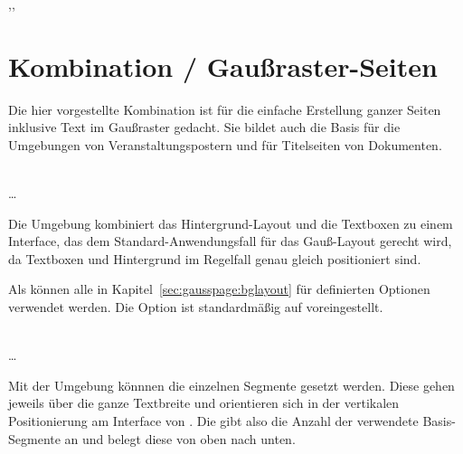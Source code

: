 \begin{Declaration}
  \\
  \\
  \\
  \\
  \\
  ,,\\
\end{Declaration}


\section{Kombination / Gaußraster-Seiten}\label{sec:gausspage:kombi}

Die hier vorgestellte Kombination ist für die einfache Erstellung ganzer Seiten
inklusive Text im Gaußraster gedacht.
Sie bildet auch die Basis für die Umgebungen von Veranstaltungspostern und
für Titelseiten von Dokumenten.

\begin{Declaration}
    \\
  \quad\dots\\
\end{Declaration}

Die Umgebung  kombiniert das Hintergrund-Layout
und die Textboxen zu einem Interface, das dem Standard-Anwendungsfall für
das Gauß-Layout gerecht wird, da Textboxen und Hintergrund im Regelfall
genau gleich positioniert sind.

Als  können alle in Kapitel~\ref{sec:gausspage:bglayout}
für  definierten Optionen verwendet werden.
Die Option  ist standardmäßig auf 
voreingestellt.

\begin{Declaration}
    \\
  \quad\dots\\
\end{Declaration}

Mit der Umgebung  könnnen die einzelnen
Segmente gesetzt werden.
Diese gehen jeweils über die ganze Textbreite und orientieren sich
in der vertikalen Positionierung am Interface von .
Die  gibt also die Anzahl der verwendete Basis-Segmente an
und belegt diese von oben nach unten.


